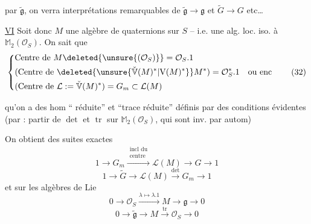 par $\widetilde{\mathfrak g}$, on verra  interprétations remarquables de $\widetilde{\mathfrak g}\to\mathfrak g$ et $\widetilde G\to G$ etc\ldots

\uline{VI} Soit donc $M$ une algèbre de quaternions sur $S$ -- i.e. une alg. loc.  iso. à  $\mathbb M_2(\mathcal O_S)$. On sait que
\[
\left\{\begin{aligned}
&\text{Centre de }M\deleted{\unsure{(\mathcal O_S)}}=\mathcal O_S.1\\
&(\text{Centre de }\deleted{\unsure{\check{\mathbb V}(M)^*|\mathrm V(M)^*}}M^*)=\mathcal O_S^*.1\quad\text{ou enc}\\
&(\text{Centre de }\mathcal L:=\check{\mathbb V}(M)^*)=G_m\subset\mathcal L(M)
\end{aligned}\right. \tag*{(32)}
\]

 qu'on a des hom `` réduite'' et ``trace réduite''
définis par des conditions évidentes (par   : partir de $\det$ et $\operatorname{tr}$ sur $\mathbb M_2(\mathcal O_S)$,  qui sont inv. par autom)

On obtient des suites exactes
\[
1\longrightarrow G_m\xrightarrow{\substack{\text{incl du}\\\text{centre}}}\mathcal L(M)\longrightarrow G\longrightarrow 1\tag*{(34)}
\]
\[
1\longrightarrow\widetilde G\longrightarrow\mathcal L(M)\xrightarrow{\det}G_m\longrightarrow1\tag*{(35)}
\]
et sur les algèbres de Lie
\[
0\longrightarrow\mathcal O_S\xrightarrow{\lambda\mapsto\lambda.1}M\longrightarrow\mathfrak g\longrightarrow0\tag*{(34$'$)}
\]
\[
0\longrightarrow\widetilde{\mathfrak g}\longrightarrow M\xrightarrow{\operatorname{tr}}\mathcal O_S\longrightarrow0\tag*{(35$'$)}
\]

